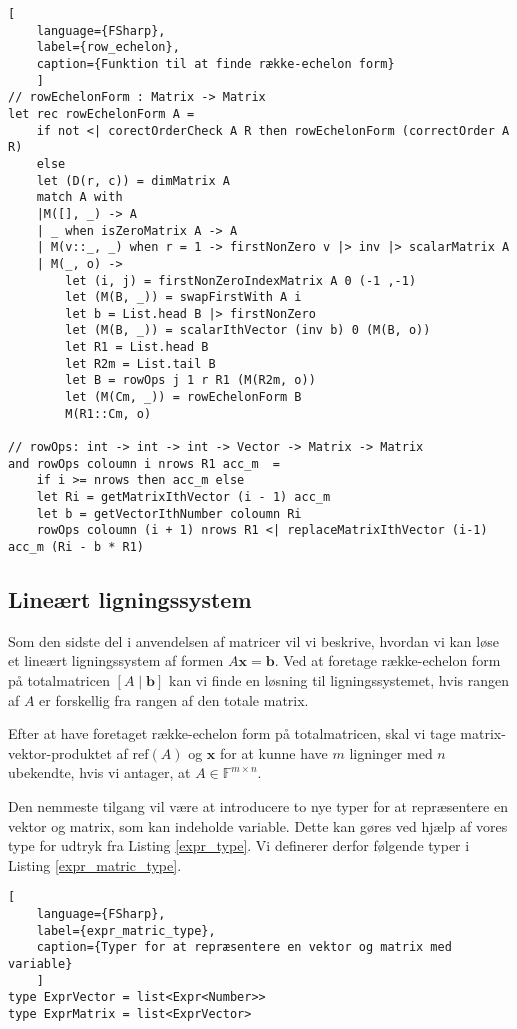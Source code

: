 \begin{lstlisting}[
    language={FSharp}, 
    label={row_echelon}, 
    caption={Funktion til at finde række-echelon form}
    ]
// rowEchelonForm : Matrix -> Matrix
let rec rowEchelonForm A = 
    if not <| corectOrderCheck A R then rowEchelonForm (correctOrder A R)
    else
    let (D(r, c)) = dimMatrix A
    match A with
    |M([], _) -> A
    | _ when isZeroMatrix A -> A
    | M(v::_, _) when r = 1 -> firstNonZero v |> inv |> scalarMatrix A  
    | M(_, o) ->
        let (i, j) = firstNonZeroIndexMatrix A 0 (-1 ,-1)
        let (M(B, _)) = swapFirstWith A i
        let b = List.head B |> firstNonZero
        let (M(B, _)) = scalarIthVector (inv b) 0 (M(B, o))
        let R1 = List.head B
        let R2m = List.tail B
        let B = rowOps j 1 r R1 (M(R2m, o))
        let (M(Cm, _)) = rowEchelonForm B
        M(R1::Cm, o)

// rowOps: int -> int -> int -> Vector -> Matrix -> Matrix  
and rowOps coloumn i nrows R1 acc_m  =
    if i >= nrows then acc_m else
    let Ri = getMatrixIthVector (i - 1) acc_m
    let b = getVectorIthNumber coloumn Ri
    rowOps coloumn (i + 1) nrows R1 <| replaceMatrixIthVector (i-1) acc_m (Ri - b * R1)
\end{lstlisting}

\subsection{Lineært ligningssystem}\label{sec:lin_eq}
Som den sidste del i anvendelsen af matricer vil vi beskrive, hvordan vi kan løse et lineært ligningssystem af formen \(A \mathbf{x} = \mathbf{b}\). Ved at foretage række-echelon form på totalmatricen \(\left[ A \mid \mathbf{b} \right]\) kan vi finde en løsning til ligningssystemet, hvis rangen af \(A\) er forskellig fra rangen af den totale matrix. 

Efter at have foretaget række-echelon form på totalmatricen, skal vi tage matrix-vektor-produktet af \(\text{ref}(A)\) og \(\mathbf{x}\) for at kunne have \(m\) ligninger med \(n\) ubekendte, hvis vi antager, at \(A \in \mathbb{F}^{m \times n}\).

Den nemmeste tilgang vil være at introducere to nye typer for at repræsentere en vektor og matrix, som kan indeholde variable. Dette kan gøres ved hjælp af vores type for udtryk fra Listing \ref{expr_type}. Vi definerer derfor følgende typer i Listing \ref{expr_matric_type}.

\begin{lstlisting}[
    language={FSharp}, 
    label={expr_matric_type}, 
    caption={Typer for at repræsentere en vektor og matrix med variable}
    ]
type ExprVector = list<Expr<Number>>
type ExprMatrix = list<ExprVector>
\end{lstlisting}

